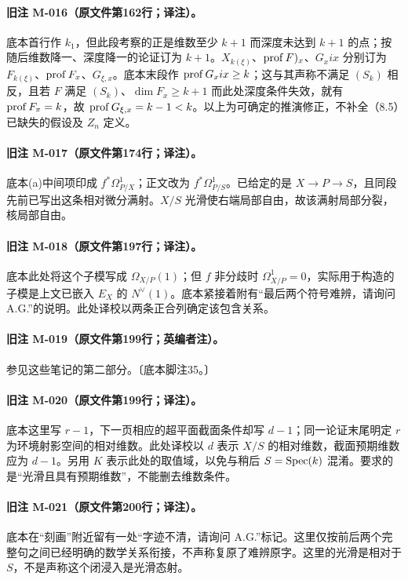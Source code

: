 \paragraph{旧注 M-016（原文件第162行；译注）。}
底本首行作 $k_1$，但此段考察的正是维数至少 $k+1$ 而深度未达到 $k+1$ 的点；按随后维数降一、深度降一的论证订为 $k+1$。$X_{k(\xi)}$、$\operatorname{prof} F)_x$、$G_xix$ 分别订为 $F_{k(\xi)}$、$\operatorname{prof} F_x$、$G_{\xi,x}$。底本末段作 $\operatorname{prof} G_xix\geq k$；这与其声称不满足 $(S_k)$ 相反，且若 $F$ 满足 $(S_k)$、$\dim F_x\geq k+1$ 而此处深度条件失效，就有 $\operatorname{prof} F_x=k$，故 $\operatorname{prof} G_{\xi,x}=k-1<k$。以上为可确定的推演修正，不补全（8.5）已缺失的假设及 $Z_n$ 定义。

\paragraph{旧注 M-017（原文件第174行；译注）。}
底本(a)中间项印成 $f^*\Omega^1_{P/X}$；正文改为 $f^*\Omega^1_{P/S}$。已给定的是 $X\to P\to S$，且同段先前已写出这条相对微分满射。$X/S$ 光滑使右端局部自由，故该满射局部分裂，核局部自由。

\paragraph{旧注 M-018（原文件第197行；译注）。}
底本此处将这个子模写成 $\Omega_{X/P}(1)$；但 $f$ 非分歧时 $\Omega^1_{X/P}=0$，实际用于构造的子模是上文已嵌入 $E_X$ 的 $N^\vee(1)$。底本紧接着附有“最后两个符号难辨，请询问 A.G.”的说明。此处译校以两条正合列确定该包含关系。

\paragraph{旧注 M-019（原文件第199行；英编者注）。}
参见这些笔记的第二部分。〔底本脚注35。〕

\paragraph{旧注 M-020（原文件第199行；译注）。}
底本这里写 $r-1$，下一页相应的超平面截面条件却写 $d-1$；同一论证末尾明定 $r$ 为环境射影空间的相对维数。此处译校以 $d$ 表示 $X/S$ 的相对维数，截面预期维数应为 $d-1$。另用 $K$ 表示此处的取值域，以免与稍后 $S=\operatorname{Spec}(k)$ 混淆。要求的是“光滑且具有预期维数”，不能删去维数条件。

\paragraph{旧注 M-021（原文件第200行；译注）。}
底本在“刻画”附近留有一处“字迹不清，请询问 A.G.”标记。这里仅按前后两个完整句之间已经明确的数学关系衔接，不声称复原了难辨原字。这里的光滑是相对于 $S$，不是声称这个闭浸入是光滑态射。

